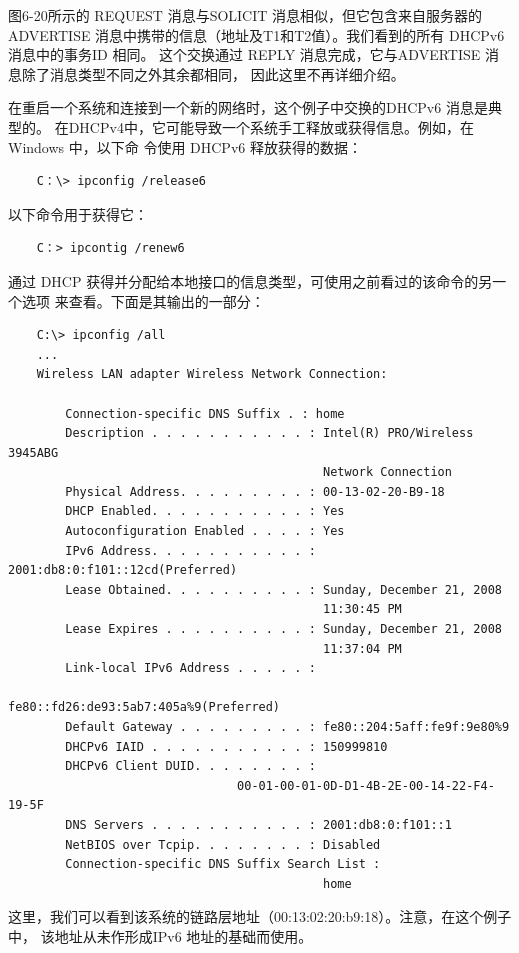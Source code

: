 图6-20所示的 REQUEST 消息与SOLICIT 消息相似，但它包含来自服务器的 ADVERTISE
消息中携带的信息（地址及T1和T2值）。我们看到的所有 DHCPv6消息中的事务ID 相同。
这个交换通过 REPLY 消息完成，它与ADVERTISE 消息除了消息类型不同之外其余都相同，
因此这里不再详细介绍。

在重启一个系统和连接到一个新的网络时，这个例子中交换的DHCPv6 消息是典型的。
在DHCPv4中，它可能导致一个系统手工释放或获得信息。例如，在 Windows 中，以下命
令使用 DHCPv6 释放获得的数据：

\begin{verbatim}
    C：\> ipconfig /release6
\end{verbatim}

以下命令用于获得它：

\begin{verbatim}
    C：> ipcontig /renew6
\end{verbatim}

通过 DHCP 获得并分配给本地接口的信息类型，可使用之前看过的该命令的另一个选项
来查看。下面是其输出的一部分：
\begin{verbatim}
    C:\> ipconfig /all
    ...
    Wireless LAN adapter Wireless Network Connection:

        Connection-specific DNS Suffix . : home
        Description . . . . . . . . . . . : Intel(R) PRO/Wireless 3945ABG
                                            Network Connection
        Physical Address. . . . . . . . . : 00-13-02-20-B9-18
        DHCP Enabled. . . . . . . . . . . : Yes
        Autoconfiguration Enabled . . . . : Yes
        IPv6 Address. . . . . . . . . . . : 2001:db8:0:f101::12cd(Preferred)
        Lease Obtained. . . . . . . . . . : Sunday, December 21, 2008
                                            11:30:45 PM
        Lease Expires . . . . . . . . . . : Sunday, December 21, 2008
                                            11:37:04 PM
        Link-local IPv6 Address . . . . . :
                                        fe80::fd26:de93:5ab7:405a%9(Preferred)
        Default Gateway . . . . . . . . . : fe80::204:5aff:fe9f:9e80%9
        DHCPv6 IAID . . . . . . . . . . . : 150999810
        DHCPv6 Client DUID. . . . . . . . :
                                00-01-00-01-0D-D1-4B-2E-00-14-22-F4-19-5F
        DNS Servers . . . . . . . . . . . : 2001:db8:0:f101::1
        NetBIOS over Tcpip. . . . . . . . : Disabled
        Connection-specific DNS Suffix Search List :
                                            home
\end{verbatim}
这里，我们可以看到该系统的链路层地址（00:13:02:20:b9:18）。注意，在这个例子中，
该地址从未作形成IPv6 地址的基础而使用。

